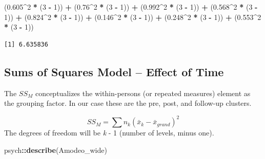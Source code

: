 \documentclass[
  11pt,
]{book}
\newenvironment{Shaded}{\begin{snugshade}}{\end{snugshade}}
\newcommand{\DecValTok}[1]{\textcolor[rgb]{0.06,0.06,0.06}{#1}}
\newcommand{\FloatTok}[1]{\textcolor[rgb]{0.06,0.06,0.06}{#1}}
\newcommand{\FunctionTok}[1]{\textcolor[rgb]{0.27,0.27,0.27}{\textbf{#1}}}
\newcommand{\NormalTok}[1]{#1}
\newcommand{\SpecialCharTok}[1]{\textcolor[rgb]{0.43,0.43,0.43}{\textbf{#1}}}
\begin{document}
\begin{Shaded}
\begin{Highlighting}[]
\NormalTok{(}\FloatTok{0.605}\SpecialCharTok{\^{}}\DecValTok{2} \SpecialCharTok{*}\NormalTok{ (}\DecValTok{3} \SpecialCharTok{{-}} \DecValTok{1}\NormalTok{)) }\SpecialCharTok{+}\NormalTok{ (}\FloatTok{0.76}\SpecialCharTok{\^{}}\DecValTok{2} \SpecialCharTok{*}\NormalTok{ (}\DecValTok{3} \SpecialCharTok{{-}} \DecValTok{1}\NormalTok{)) }\SpecialCharTok{+}\NormalTok{ (}\FloatTok{0.992}\SpecialCharTok{\^{}}\DecValTok{2} \SpecialCharTok{*}\NormalTok{ (}\DecValTok{3} \SpecialCharTok{{-}} \DecValTok{1}\NormalTok{)) }\SpecialCharTok{+}\NormalTok{ (}\FloatTok{0.568}\SpecialCharTok{\^{}}\DecValTok{2} \SpecialCharTok{*}
\NormalTok{    (}\DecValTok{3} \SpecialCharTok{{-}} \DecValTok{1}\NormalTok{)) }\SpecialCharTok{+}\NormalTok{ (}\FloatTok{0.824}\SpecialCharTok{\^{}}\DecValTok{2} \SpecialCharTok{*}\NormalTok{ (}\DecValTok{3} \SpecialCharTok{{-}} \DecValTok{1}\NormalTok{)) }\SpecialCharTok{+}\NormalTok{ (}\FloatTok{0.146}\SpecialCharTok{\^{}}\DecValTok{2} \SpecialCharTok{*}\NormalTok{ (}\DecValTok{3} \SpecialCharTok{{-}} \DecValTok{1}\NormalTok{)) }\SpecialCharTok{+}\NormalTok{ (}\FloatTok{0.248}\SpecialCharTok{\^{}}\DecValTok{2} \SpecialCharTok{*}\NormalTok{ (}\DecValTok{3} \SpecialCharTok{{-}}
    \DecValTok{1}\NormalTok{)) }\SpecialCharTok{+}\NormalTok{ (}\FloatTok{0.553}\SpecialCharTok{\^{}}\DecValTok{2} \SpecialCharTok{*}\NormalTok{ (}\DecValTok{3} \SpecialCharTok{{-}} \DecValTok{1}\NormalTok{))}
\end{Highlighting}
\end{Shaded}

\begin{verbatim}
[1] 6.635836
\end{verbatim}

\hypertarget{sums-of-squares-model-effect-of-time}{%
\subsection{Sums of Squares Model -- Effect of Time}\label{sums-of-squares-model-effect-of-time}}

The \(SS_{M}\) conceptualizes the within-persons (or repeated measures) element as the grouping factor. In our case these are the pre, post, and follow-up clusters.

\[SS_{M}= \sum n_{k}(\bar{x}_{k}-\bar{x}_{grand})^{2}\] The degrees of freedom will be \emph{k} - 1 (number of levels, minus one).

\begin{Shaded}
\begin{Highlighting}[]
\NormalTok{psych}\SpecialCharTok{::}\FunctionTok{describe}\NormalTok{(Amodeo\_wide)}
\end{Highlighting}
\end{Shaded}
\end{document}
